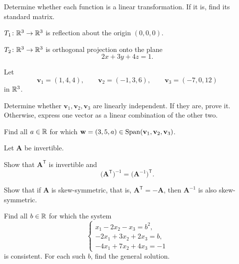 \begin{problem}
Determine whether each function is a linear transformation. If it is, find its standard matrix.
\begin{problemsubparts}
\item $T_1\colon\mathbb{R}^3\to\mathbb{R}^3$ is reflection about the origin $(0,0,0)$.
\item $T_2\colon\mathbb{R}^3\to\mathbb{R}^3$ is orthogonal projection onto the plane
\[
2x+3y+4z=1.
\]
\end{problemsubparts}
\end{problem}

\begin{problem}
Let
\[
\mathbf v_1=(1,4,4),\qquad
\mathbf v_2=(-1,3,6),\qquad
\mathbf v_3=(-7,0,12)
\]
in $\mathbb{R}^3$.
\begin{problemsubparts}
\item Determine whether $\mathbf v_1,\mathbf v_2,\mathbf v_3$ are linearly independent. If they are, prove it. Otherwise, express one vector as a linear combination of the other two.
\item Find all $a\in\mathbb{R}$ for which $\mathbf w=(3,5,a)\in\operatorname{Span}(\mathbf v_1,\mathbf v_2,\mathbf v_3)$.
\end{problemsubparts}
\end{problem}

\begin{problem}
Let $\mathbf A$ be invertible.
\begin{problemsubparts}
\item Show that $\mathbf A^{\mathsf T}$ is invertible and
\[
\bigl(\mathbf A^{\mathsf T}\bigr)^{-1}=\bigl(\mathbf A^{-1}\bigr)^{\mathsf T}.
\]
\item Show that if $\mathbf A$ is skew-symmetric, that is, $\mathbf A^{\mathsf T}=-\mathbf A$, then $\mathbf A^{-1}$ is also skew-symmetric.
\end{problemsubparts}
\end{problem}

\begin{problem}
Find all $b\in\mathbb{R}$ for which the system
\[
\begin{cases}
x_1-2x_2-x_3=b^2,\\
-2x_1+3x_2+2x_3=b,\\
-4x_1+7x_2+4x_3=-1
\end{cases}
\]
is consistent. For each such $b$, find the general solution.
\end{problem}

